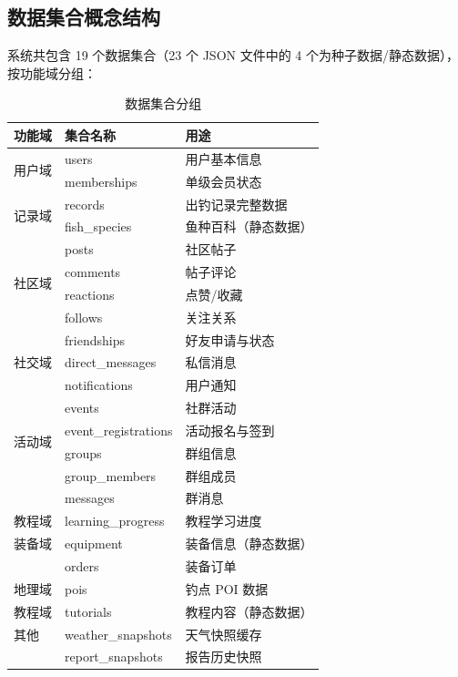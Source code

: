\documentclass[12pt,a4paper]{ctexart}
\begin{document}
\subsection{数据集合概念结构}

系统共包含 19 个数据集合（23 个 JSON 文件中的 4 个为种子数据/静态数据），按功能域分组：

\begin{table}[H]
  \centering
  \caption{数据集合分组}
  \label{tab:collection-groups}
  \begin{tabular}{p{3cm}p{4cm}p{5cm}}
    \toprule
    \textbf{功能域} & \textbf{集合名称} & \textbf{用途} \\
    \midrule
    \multirow{2}{*}{用户域} & users & 用户基本信息 \\
    & memberships & 单级会员状态 \\
    \hline
    \multirow{2}{*}{记录域} & records & 出钓记录完整数据 \\
    & fish\_species & 鱼种百科（静态数据） \\
    \hline
    \multirow{4}{*}{社区域} & posts & 社区帖子 \\
    & comments & 帖子评论 \\
    & reactions & 点赞/收藏 \\
    & follows & 关注关系 \\
    \hline
    \multirow{3}{*}{社交域} & friendships & 好友申请与状态 \\
    & direct\_messages & 私信消息 \\
    & notifications & 用户通知 \\
    \hline
    \multirow{4}{*}{活动域} & events & 社群活动 \\
    & event\_registrations & 活动报名与签到 \\
    & groups & 群组信息 \\
    & group\_members & 群组成员 \\
    & messages & 群消息 \\
    \hline
    教程域 & learning\_progress & 教程学习进度 \\
    \hline
    装备域 & equipment & 装备信息（静态数据） \\
    & orders & 装备订单 \\
    \hline
    地理域 & pois & 钓点 POI 数据 \\
    \hline
    教程域 & tutorials & 教程内容（静态数据） \\
    \hline
    其他 & weather\_snapshots & 天气快照缓存 \\
    & report\_snapshots & 报告历史快照 \\
    \bottomrule
  \end{tabular}
\end{table}
\end{document}
